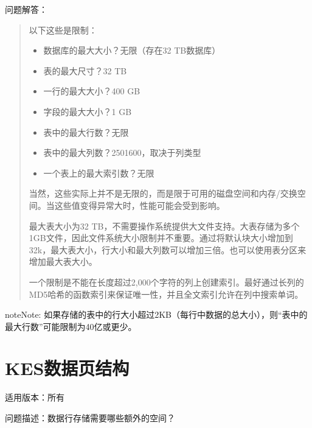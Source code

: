 \documentclass[letterpaper,10pt,english]{sphinxmanual}
\begin{document}
问题解答：
\begin{quote}

以下这些是限制：
\begin{itemize}
\item {} 
数据库的最大大小？无限（存在32 TB数据库）

\item {} 
表的最大尺寸？32 TB

\item {} 
一行的最大大小？400 GB

\item {} 
字段的最大大小？1 GB

\item {} 
表中的最大行数？无限

\item {} 
表中的最大列数？250\sphinxhyphen{}1600，取决于列类型

\item {} 
一个表上的最大索引数？无限

\end{itemize}

当然，这些实际上并不是无限的，而是限于可用的磁盘空间和内存/交换空间。当这些值变得异常大时，性能可能会受到影响。

最大表大小为32 TB，不需要操作系统提供大文件支持。大表存储为多个1GB文件，因此文件系统大小限制并不重要。通过将默认块大小增加到32k，最大表大小，行大小和最大列数可以增加三倍。也可以使用表分区来增加最大表大小。

一个限制是不能在长度超过2,000个字符的列上创建索引。最好通过长列的MD5哈希的函数索引来保证唯一性，并且全文索引允许在列中搜索单词。
\end{quote}

\begin{sphinxadmonition}{note}{Note:}
如果存储的表中的行大小超过2KB（每行中数据的总大小），则“表中的最大行数”可能限制为40亿或更少。
\end{sphinxadmonition}


\section{KES数据页结构}
\label{\detokenize{sql:kes}}
适用版本：所有

问题描述：数据行存储需要哪些额外的空间？
\end{document}
